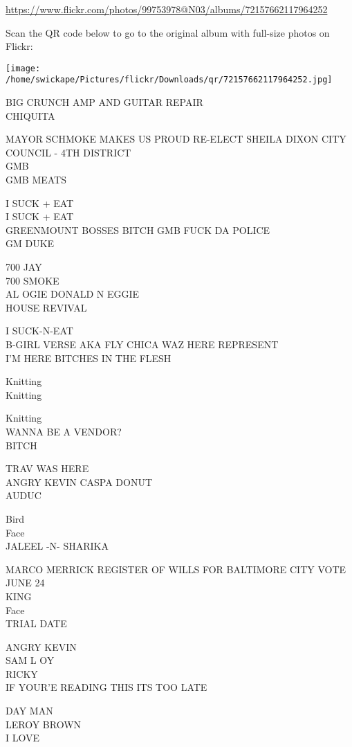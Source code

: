 \documentclass[10pt,letterpaper]{article}
\begin{document}
\url{https://www.flickr.com/photos/99753978@N03/albums/72157662117964252}

Scan the QR code below to go to the original album with full-size photos on Flickr:

\texttt{[image: /home/swickape/Pictures/flickr/Downloads/qr/72157662117964252.jpg]}
\pagebreak

BIG CRUNCH AMP AND GUITAR REPAIR\\
CHIQUITA

MAYOR SCHMOKE MAKES US PROUD RE{-}ELECT SHEILA DIXON CITY COUNCIL {-} 4TH DISTRICT\\
GMB\\
GMB MEATS

I SUCK + EAT\\
I SUCK + EAT\\
GREENMOUNT BOSSES BITCH GMB FUCK DA POLICE\\
GM DUKE

700 JAY\\
700 SMOKE\\
AL OGIE DONALD N EGGIE\\
HOUSE REVIVAL

I SUCK{-}N{-}EAT\\
B{-}GIRL VERSE AKA FLY CHICA WAZ HERE REPRESENT\\
I'M HERE BITCHES IN THE FLESH

Knitting\\
Knitting

Knitting\\
WANNA BE A VENDOR?\\
BITCH

TRAV WAS HERE\\
ANGRY KEVIN CASPA DONUT\\
AUDUC

Bird\\
Face\\
JALEEL {-}N{-} SHARIKA

MARCO MERRICK REGISTER OF WILLS FOR BALTIMORE CITY VOTE JUNE 24\\
KING\\
Face\\
TRIAL DATE

ANGRY KEVIN\\
SAM L OY\\
RICKY\\
IF YOUR'E READING THIS ITS TOO LATE

DAY MAN\\
LEROY BROWN\\
I LOVE
\end{document}
